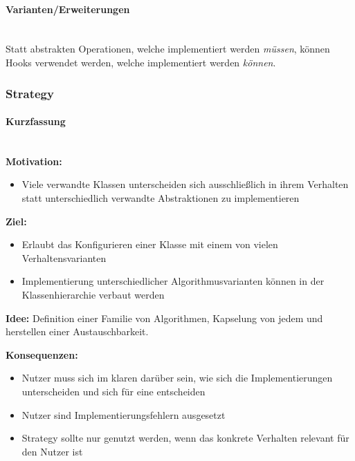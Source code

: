 \documentclass[
    ngerman,
    color=3b,
    summary,
    boxarc,
    main,
]{rubos-tuda-template}
\begin{document}
\paragraph{Varianten/Erweiterungen}\mbox{}\\
Statt abstrakten Operationen, welche implementiert werden \textit{müssen}, können Hooks verwendet werden, welche implementiert werden \textit{können}.

\clearpage
\subsubsection{Strategy}
\paragraph{Kurzfassung}\mbox{}\\
\textbf{Motivation:}
\begin{itemize}
    \item Viele verwandte Klassen unterscheiden sich ausschließlich in ihrem Verhalten statt unterschiedlich verwandte Abstraktionen zu implementieren
\end{itemize}

\textbf{Ziel:}
\begin{itemize}
    \item Erlaubt das Konfigurieren einer Klasse mit einem von vielen Verhaltensvarianten
    \item Implementierung unterschiedlicher Algorithmusvarianten können in der Klassenhierarchie verbaut werden
\end{itemize}

\textbf{Idee:} Definition einer Familie von Algorithmen, Kapselung von jedem und herstellen einer Austauschbarkeit.

\textbf{Konsequenzen:}
\begin{itemize}
    \item Nutzer muss sich im klaren darüber sein, wie sich die Implementierungen unterscheiden und sich für eine entscheiden
    \item Nutzer sind Implementierungsfehlern ausgesetzt
    \item Strategy sollte nur genutzt werden, wenn das konkrete Verhalten relevant für den Nutzer ist
\end{itemize}
\end{document}
